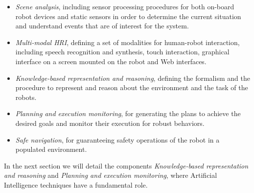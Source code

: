 \begin{itemize}
\item \emph{Scene analysis}, including sensor processing procedures for both on-board robot devices and static sensors in order to determine the current situation and understand events that are of interest for the system.

\item \emph{Multi-modal HRI}, defining a set of modalities for human-robot interaction, including speech recognition and synthesis, touch interaction, graphical interface on a screen mounted on the robot and Web interfaces.

\item \emph{Knowledge-based representation and reasoning}, defining the formalism and the procedure to represent and reason about the environment and the task of the robots.

\item \emph{Planning and execution monitoring}, for generating the plans to achieve the desired goals and monitor their execution for robust behaviors.

\item \emph{Safe navigation}, for guaranteeing safety operations of the robot in a populated environment.

\end{itemize}

In the next section we will detail the components 
\emph{Knowledge-based representation and reasoning} and
\emph{Planning and execution monitoring},
where Artificial Intelligence techniques have a fundamental role.



